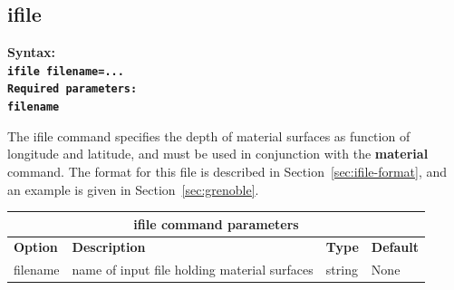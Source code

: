 \documentclass[11pt]{report}
\begin{document}
\subsection{ifile}
\label{keyword:ifile}
\begin{flushleft}\bf
Syntax:\\
\tt ifile filename=...\\
\bf Required parameters:\\
\tt filename
\end{flushleft}
The ifile command specifies the depth of material surfaces as function of longitude and latitude,
and must be used in conjunction with the {\bf material} command. The format for this file is
described in Section~\ref{sec:ifile-format}, and an example is given in Section~\ref{sec:grenoble}.
\begin{center}
\begin{tabular}{|l|p{8cm}|l|l|} \hline
\multicolumn{4}{|c|}{\bf ifile command parameters}\\ \hline
\bf{Option} & \bf{Description} & \bf{Type} & \bf{Default} \\ \hline \hline
filename & name of input file holding material surfaces & string & None  \\ \hline
\end{tabular}
\end{center}
\end{document}
